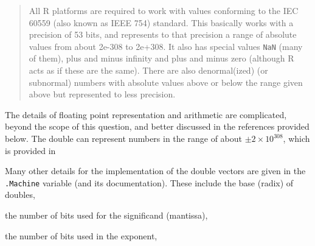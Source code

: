 \documentclass[]{book}
\newenvironment{Shaded}{\begin{snugshade}}{\end{snugshade}}
\newcommand{\CommentTok}[1]{\textcolor[rgb]{0.56,0.35,0.01}{\textit{#1}}}
\newcommand{\NormalTok}[1]{#1}
\newcommand{\OperatorTok}[1]{\textcolor[rgb]{0.81,0.36,0.00}{\textbf{#1}}}
\theoremstyle{plain}
\theoremstyle{remark}
\begin{document}
\begin{quote}
All R platforms are required to work with values conforming to the IEC 60559
(also known as IEEE 754) standard. This basically works with a precision of
53 bits, and represents to that precision a range of absolute values from
about 2e-308 to 2e+308. It also has special values \texttt{NaN} (many of them),
plus and minus infinity
and plus and minus zero (although R acts as if these are the same). There are
also denormal(ized) (or subnormal) numbers with absolute values above or below
the range given above but represented to less precision.
\end{quote}

The details of floating point representation and arithmetic are complicated, beyond
the scope of this question, and better discussed in the references provided below.
The double can represent numbers in the range of about \(\pm 2 \times 10^{308}\), which is
provided in

\begin{Shaded}
\end{Shaded}

Many other details for the implementation of the double vectors are given in the \texttt{.Machine} variable (and its documentation).
These include the base (radix) of doubles,

\begin{Shaded}
\end{Shaded}

the number of bits used for the significand (mantissa),

\begin{Shaded}
\end{Shaded}

the number of bits used in the exponent,

\begin{Shaded}
\end{Shaded}
\end{document}
